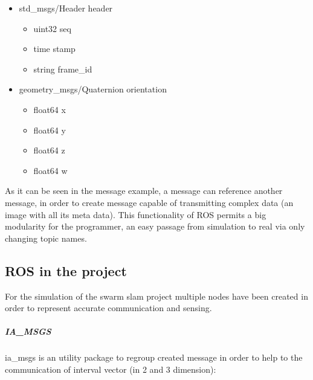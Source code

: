 \begin{minipage}[b]{0.8\textwidth}
\begin{itemize}[label={},itemsep=0cm,topsep=0cm]
\item std\_msgs/Header header
  \begin{itemize}[label={},itemsep=0cm,topsep=0cm]
  \item uint32 seq
  \item time stamp
  \item string frame\_id
   \end{itemize}
\item geometry\_msgs/Quaternion orientation
  \begin{itemize}[label={},itemsep=0cm,topsep=0cm]
  \item float64 x
  \item float64 y
  \item float64 z
  \item float64 w
  \end{itemize}
\end{itemize}
\end{minipage}


As it can be seen in the message example, a message can reference another message, in order to create message capable of transmitting complex data (an image with all its meta data).
This functionality of ROS permits a big modularity for the programmer, an easy passage from simulation to real via only changing topic names.

\subsection{ROS in the project}

For the simulation of the swarm slam project multiple nodes have been 
created in order to represent accurate communication and sensing.

\subparagraph*{IA\_MSGS}

ia\_msgs is an utility package to regroup created message in order to help to the communication of interval vector (in 2 and 3 dimension):\\


